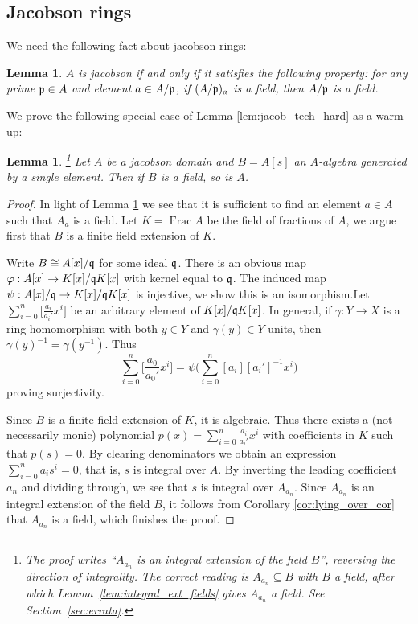 \documentclass[12pt]{article}
\theoremstyle{plain}
\newtheorem{lemma}[thm]{Lemma}
\theoremstyle{definition}
\begin{document}
\subsection{Jacobson rings}
We need the following fact about jacobson rings:
\begin{lemma}\label{lem:jacob_def}
$A$ is jacobson if and only if it satisfies the following property: for any prime $\frak{p} \in A$ and element $a \in A/\frak{p}$, if $(A/\frak{p})_a$ is a field, then $A/\frak{p}$ is a field.
\end{lemma}
We prove the following special case of Lemma \ref{lem:jacob_tech_hard} as a warm up:
\begin{lemma}\label{lem:jacob_tech_easy}\footnote{The proof writes ``$A_{a_n}$ is an integral extension of the field $B$'', reversing the direction of integrality. The correct reading is $A_{a_n}\subseteq B$ with $B$ a field, after which Lemma~\ref{lem:integral_ext_fields} gives $A_{a_n}$ a field. See Section~\ref{sec:errata}.}
Let $A$ be a jacobson domain and $B = A[s]$ an $A$-algebra generated by a single element. Then if $B$ is a field, so is $A$.
\end{lemma}
\begin{proof}
In light of Lemma \ref{lem:jacob_def} we see that it is sufficient to find an element $a \in A$ such that $A_a$ is a field. Let $K = \operatorname{Frac}A$ be the field of fractions of $A$, we argue first that $B$ is a finite field extension of $K$.

Write $B \cong A[x]/\frak{q}$ for some ideal $\frak{q}$. There is an obvious map $\varphi: A[x] \to K[x]/\frak{q}K[x]$ with kernel equal to $\frak{q}$. The induced map $\psi: A[x]/\frak{q} \to K[x]/\frak{q}K[x]$ is injective, we show this is an isomorphism.Let $\sum_{i = 0}^n\big[\frac{a_i}{a_i'}x^i\big]$ be an arbitrary element of $K[x]/\frak{q}K[x]$. In general, if $\gamma: Y \to X$ is a ring homomorphism with both $y \in Y$ and $\gamma(y) \in Y$ units, then $\gamma(y)^{-1} = \gamma(y^{-1}).$ Thus 
\[\sum_{i = 0}^n\big[\frac{a_0}{a_0'}x^i\big] = \psi\Big(\sum_{i = 0}^n[a_i][a_i']^{-1}x^i\Big)\]
proving surjectivity.

Since $B$ is a finite field extension of $K$, it is algebraic. Thus there exists a (not necessarily monic) polynomial $p(x) = \sum_{i = 0}^n\frac{a_i}{a_i'}x^i$ with coefficients in $K$ such that $p(s) = 0$. By clearing denominators we obtain an expression $\sum_{i = 0}^na_i s^i = 0$, that is, $s$ is integral over $A$. By inverting the leading coefficient $a_n$ and dividing through, we see that $s$ is integral over $A_{a_n}$. Since $A_{a_n}$ is an integral extension of the field $B$, it follows from Corollary \ref{cor:lying_over_cor} that $A_{a_n}$ is a field, which finishes the proof.
\end{proof}
\end{document}
